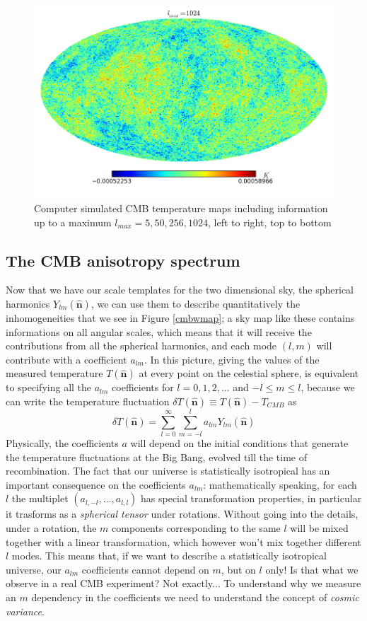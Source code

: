 \begin{figure}
\begin{center}
\includegraphics[scale=0.3]{CMB/l1024.png}
\end{center}
\caption{Computer simulated CMB temperature maps including information up to a maximum $l_{max}=5,50,256,1024$, left to right, top to bottom}
\label{simcmbsky}
\end{figure}
\subsection{The CMB anisotropy spectrum}
Now that we have our scale templates for the two dimensional sky, the spherical harmonics $Y_{lm}(\mathbf{\hat{n}})$, we can use them to describe quantitatively the inhomogeneities that we see in Figure \ref{cmbwmap}; a sky map like these contains informations on all angular scales, which means that it will receive the contributions from all the spherical harmonics, and each mode $(l,m)$ will contribute with a coefficient $a_{lm}$. In this picture, giving the values of the measured temperature $T(\mathbf{\hat{n}})$ at every point on the celestial sphere, is equivalent to specifying all the $a_{lm}$ coefficients for $l=0,1,2,...$ and $-l\leq m \leq l$, because we can write the temperature fluctuation $\delta T(\mathbf{\hat{n}})\equiv T(\mathbf{\hat{n}})-T_{CMB}$ as 
\begin{equation}
\delta T(\mathbf{\hat{n}})=\sum_{l=0}^{\infty}\sum_{m=-l}^la_{lm}Y_{lm}(\mathbf{\hat{n}})
\end{equation}
Physically, the coefficients $a$ will depend on the initial conditions that generate the temperature fluctuations at the Big Bang, evolved till the time of recombination. The fact that our universe is statistically isotropical has an important consequence on the coefficients $a_{lm}$: mathematically speaking, for each $l$ the multiplet $(a_{l,-l},...,a_{l,l})$ has special transformation properties, in particular it trasforms as a \textit{spherical tensor} under rotations. Without going into the details, under a rotation, the $m$ components corresponding to the same $l$ will be mixed together with a linear transformation, which however won't mix together different $l$ modes. This means that, if we want to describe a statistically isotropical universe, our $a_{lm}$ coefficients cannot depend on $m$, but on $l$ only! Is that what we observe in a real CMB experiment? Not exactly... To understand why we measure an $m$ dependency in the coefficients we need to understand the concept of \textit{cosmic variance}.   

